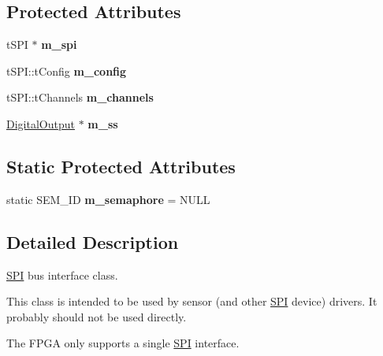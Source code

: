 \subsection*{Protected Attributes}
\begin{DoxyCompactItemize}
\item 
\hypertarget{classSPI_a2e51fd2a5f60a207e1948fcce6ce4b6a}{
tSPI $\ast$ {\bfseries m\_\-spi}}
\label{classSPI_a2e51fd2a5f60a207e1948fcce6ce4b6a}

\item 
\hypertarget{classSPI_a246566dd89a56e47235573fa1cbf4650}{
tSPI::tConfig {\bfseries m\_\-config}}
\label{classSPI_a246566dd89a56e47235573fa1cbf4650}

\item 
\hypertarget{classSPI_a400f5597cc5fa5d5ec4e53b16e7e563a}{
tSPI::tChannels {\bfseries m\_\-channels}}
\label{classSPI_a400f5597cc5fa5d5ec4e53b16e7e563a}

\item 
\hypertarget{classSPI_abb5b7fdb1d7bd262f01f1955611dad04}{
\hyperlink{classDigitalOutput}{DigitalOutput} $\ast$ {\bfseries m\_\-ss}}
\label{classSPI_abb5b7fdb1d7bd262f01f1955611dad04}

\end{DoxyCompactItemize}
\subsection*{Static Protected Attributes}
\begin{DoxyCompactItemize}
\item 
\hypertarget{classSPI_a5526fc62f7ed652c65ab9e4a5f778062}{
static SEM\_\-ID {\bfseries m\_\-semaphore} = NULL}
\label{classSPI_a5526fc62f7ed652c65ab9e4a5f778062}

\end{DoxyCompactItemize}


\subsection{Detailed Description}
\hyperlink{classSPI}{SPI} bus interface class.

This class is intended to be used by sensor (and other \hyperlink{classSPI}{SPI} device) drivers. It probably should not be used directly.

The FPGA only supports a single \hyperlink{classSPI}{SPI} interface. 

